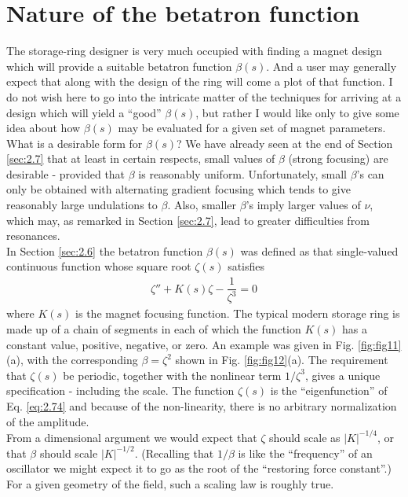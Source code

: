 \section{Nature of the betatron function}\label{sec:2.9}

The storage-ring designer is very much occupied with finding a magnet design which will provide a suitable betatron function $\beta(s)$. And a user may generally expect that along with the design of the ring will come a plot of that function.  I do not wish here to go into the intricate matter
 of the techniques for arriving at a design which will yield a ``good'' $\beta(s)$, but rather I would like only to give some idea about how $\beta(s)$ may be evaluated for a given set of magnet parameters. \\
What is a desirable form for $\beta(s)$? We have already seen at the end of Section \ref{sec:2.7} that at least in certain respects, small values of $\beta$ (strong focusing) are desirable - provided that $\beta$ is reasonably uniform. Unfortunately, small $\beta$’s can only be obtained with alternating gradient focusing which tends to give reasonably large undulations to $\beta$. Also, smaller $\beta$’s imply larger values of $\nu$, which may, as remarked in Section \ref{sec:2.7}, lead to greater difficulties from resonances. \\
In Section \ref{sec:2.6} the betatron function $\beta(s)$ was defined as that single-valued continuous function whose square root $\zeta(s)$ satisfies
\begin{align} \label{eq:2.74}
	\zeta''+K(s)\zeta-\dfrac{1}{\zeta^3}=0
\end{align}
where $K(s)$ is the magnet focusing function. The typical modern storage ring is made up of a chain of segments in each of which the function $K(s)$ has a constant value, positive, negative,
 or zero. An example was given in Fig. \ref{fig:fig11}(a), with the corresponding $\beta=\zeta^2$ shown in Fig. \ref{fig:fig12}(a).
The requirement that $\zeta(s)$ be periodic, together with the nonlinear term $1/\zeta^3$, gives a unique specification - including the scale. The function $\zeta(s)$ is the “eigenfunction” of Eq. \eqref{eq:2.74} and because of the non-linearity, there is no arbitrary normalization of the amplitude. \\
From a dimensional argument we would expect that $\zeta$ should scale as $|K|^{-1/4}$, or that $\beta$ should scale $|K|^{-1/2}$. (Recalling that $1/\beta$ is like the ``frequency'' of an
oscillator we might expect it to go as the root of the “restoring force constant”.) For a given geometry of the field, such a scaling law is roughly true. \\
